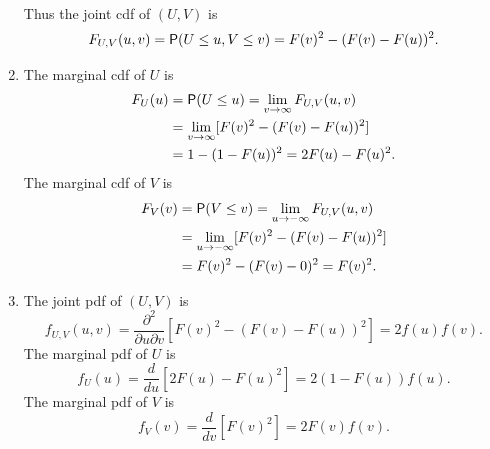 \documentclass[12pt]{article}
\newcommand{\Prob}{{\sf P}}
\newenvironment{problem}[2][Problem]{\begin{trivlist}
\item[\hskip \labelsep {\bfseries #1}\hskip \labelsep {\bfseries #2.}]}
{\end{trivlist}}
\begin{document}
\begin{problem}{1}
\begin{enumerate}
\begin{align*}
    \end{align*}
    Thus the joint cdf of $(U,V)$ is
    \[
      F_{U,V}(u,v) = \Prob(U \le u, V \le v) = F(v)^2 - (F(v) - F(u))^2.
    \]
    \item The marginal cdf of $U$ is
    \begin{align*}
      F_U(u) &= \Prob(U \le u) = \lim_{v \to \infty} F_{U,V}(u,v) \\
      &= \lim_{v \to \infty} [F(v)^2 - (F(v) - F(u))^2] \\
      &= 1 - (1 - F(u))^2 = 2F(u) - F(u)^2.
    \end{align*}
    The marginal cdf of $V$ is
    \begin{align*}
      F_V(v) &= \Prob(V \le v) = \lim_{u \to -\infty} F_{U,V}(u,v) \\
      &= \lim_{u \to -\infty} [F(v)^2 - (F(v) - F(u))^2] \\
      &= F(v)^2 - (F(v) - 0)^2 = F(v)^2.
    \end{align*}
    \item The joint pdf of $(U,V)$ is
    \[
      f_{U,V}(u,v) = \frac{\partial^2}{\partial u \partial v} 
      [F(v)^2 - (F(v) - F(u))^2] = 2 f(u) f(v).
    \]
    The marginal pdf of $U$ is
    \[
      f_U(u) = \frac{d}{du} [2F(u) - F(u)^2] = 2(1 - F(u)) f(u).
    \]
    The marginal pdf of $V$ is
    \[
      f_V(v) = \frac{d}{dv} [F(v)^2] = 2 F(v) f(v).
    \]
  \end{enumerate}
\end{problem}
\end{document}
